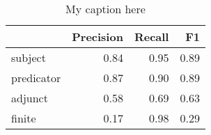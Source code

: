 \begin{table}[!ht]
\centering
\begin{tabular}{lrrr}
\toprule
{} &  Precision &  Recall &   F1 \\
\midrule
subject    &       0.84 &    0.95 & 0.89 \\
predicator &       0.87 &    0.90 & 0.89 \\
adjunct    &       0.58 &    0.69 & 0.63 \\
finite     &       0.17 &    0.98 & 0.29 \\
\bottomrule
\end{tabular}
\caption{My caption here}
\label{tab:unit-elements-mood-combined-F1}
\end{table}